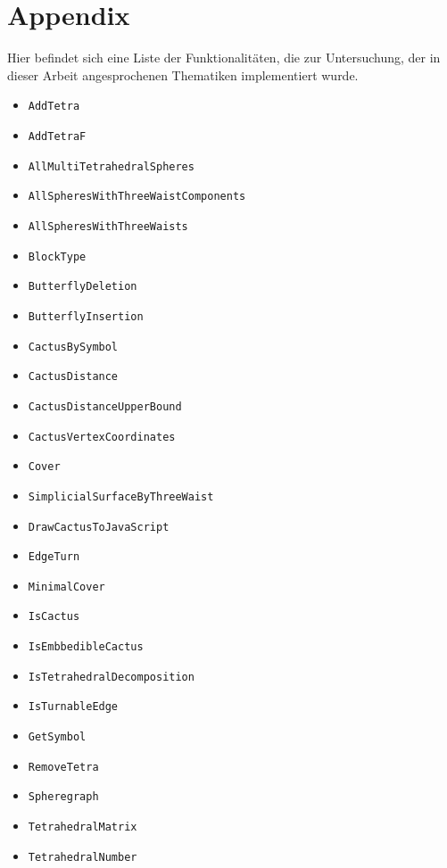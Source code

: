 \documentclass[12pt,titlepage,twoside,cleardoublepage]{article}
\theoremstyle{nummermitklammern}
\numberwithin{equation}{section}
\begin{document}
\section*{Appendix}
Hier befindet sich eine Liste der Funktionalitäten, die zur Untersuchung, der in dieser Arbeit angesprochenen Thematiken implementiert wurde. 
\begin{itemize}
\item \texttt{AddTetra}
\item \texttt{AddTetraF}
\item \texttt{AllMultiTetrahedralSpheres}
\item \texttt{AllSpheresWithThreeWaistComponents}
\item \texttt{AllSpheresWithThreeWaists}
\item \texttt{BlockType}
\item \texttt{ButterflyDeletion}
\item \texttt{ButterflyInsertion}
\item \texttt{CactusBySymbol}
\item \texttt{CactusDistance}
\item \texttt{CactusDistanceUpperBound}
\item \texttt{CactusVertexCoordinates}
\item \texttt{Cover}
\item \texttt{SimplicialSurfaceByThreeWaist}
\item \texttt{DrawCactusToJavaScript}
\item \texttt{EdgeTurn}
\item \texttt{MinimalCover}
\item \texttt{IsCactus}
\item \texttt{IsEmbbedibleCactus}
\item \texttt{IsTetrahedralDecomposition}
\item \texttt{IsTurnableEdge}
\item \texttt{GetSymbol}
\item \texttt{RemoveTetra}
\item \texttt{Spheregraph}
\item \texttt{TetrahedralMatrix}
\item \texttt{TetrahedralNumber}


\end{itemize}
\end{document}
